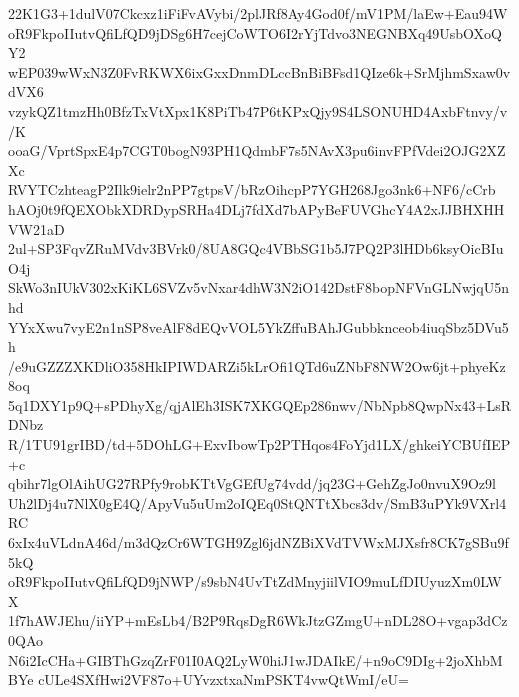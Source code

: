 22K1G3+1dulV07Ckcxz1iFiFvAVybi/2plJRf8Ay4God0f/mV1PM/laEw+Eau94W
oR9FkpoIIutvQfiLfQD9jDSg6H7cejCoWTO6I2rYjTdvo3NEGNBXq49UsbOXoQY2
wEP039wWxN3Z0FvRKWX6ixGxxDnmDLccBnBiBFsd1QIze6k+SrMjhmSxaw0vdVX6
vzykQZ1tmzHh0BfzTxVtXpx1K8PiTb47P6tKPxQjy9S4LSONUHD4AxbFtnvy/v/K
ooaG/VprtSpxE4p7CGT0bogN93PH1QdmbF7s5NAvX3pu6invFPfVdei2OJG2XZXc
RVYTCzhteagP2Ilk9ielr2nPP7gtpsV/bRzOihcpP7YGH268Jgo3nk6+NF6/cCrb
hAOj0t9fQEXObkXDRDypSRHa4DLj7fdXd7bAPyBeFUVGhcY4A2xJJBHXHHVW21aD
2ul+SP3FqvZRuMVdv3BVrk0/8UA8GQc4VBbSG1b5J7PQ2P3lHDb6ksyOicBIuO4j
SkWo3nIUkV302xKiKL6SVZv5vNxar4dhW3N2iO142DstF8bopNFVnGLNwjqU5nhd
YYxXwu7vyE2n1nSP8veAlF8dEQvVOL5YkZffuBAhJGubbknceob4iuqSbz5DVu5h
/e9uGZZZXKDliO358HkIPIWDARZi5kLrOfi1QTd6uZNbF8NW2Ow6jt+phyeKz8oq
5q1DXY1p9Q+sPDhyXg/qjAlEh3ISK7XKGQEp286nwv/NbNpb8QwpNx43+LsRDNbz
R/1TU91grIBD/td+5DOhLG+ExvIbowTp2PTHqos4FoYjd1LX/ghkeiYCBUfIEP+c
qbihr7lgOlAihUG27RPfy9robKTtVgGEfUg74vdd/jq23G+GehZgJo0nvuX9Oz9l
Uh2lDj4u7NlX0gE4Q/ApyVu5uUm2oIQEq0StQNTtXbcs3dv/SmB3uPYk9VXrl4RC
6xIx4uVLdnA46d/m3dQzCr6WTGH9Zgl6jdNZBiXVdTVWxMJXsfr8CK7gSBu9f5kQ
oR9FkpoIIutvQfiLfQD9jNWP/s9sbN4UvTtZdMnyjiilVIO9muLfDIUyuzXm0LWX
1f7hAWJEhu/iiYP+mEsLb4/B2P9RqsDgR6WkJtzGZmgU+nDL28O+vgap3dCz0QAo
N6i2IcCHa+GIBThGzqZrF01I0AQ2LyW0hiJ1wJDAIkE/+n9oC9DIg+2joXhbMBYe
cULe4SXfHwi2VF87o+UYvzxtxaNmPSKT4vwQtWmI/eU=
